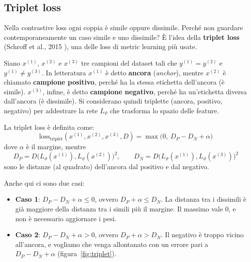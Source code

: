 \subsection{Triplet loss}
Nella contrastive loss ogni coppia è simile oppure dissimile. Perché non guardare contemporaneamente un caso simile e uno dissimile? È l'idea della \textbf{triplet loss} (Schroff et al., 2015 \cite{Schroff2015}), una delle loss di metric learning più usate.

Siano $x^{(1)}$, $x^{(2)}$ e $x^{(3)}$ tre campioni del dataset tali che $y^{(1)} = y^{(2)}$ e $y^{(1)} \neq y^{(3)}$. In letteratura $x^{(1)}$ è detto \textbf{ancora} (\emph{anchor}), mentre $x^{(2)}$ è chiamato \textbf{campione positivo}, perché ha la stessa etichetta dell'ancora (è simile). $x^{(3)}$, infine, è detto \textbf{campione negativo}, perché ha un'etichetta diversa dall'ancora (è dissimile). Si considerano quindi triplette (ancora, positivo, negativo) per addestrare la rete $L_\vartheta$ che trasforma lo spazio delle feature.

\begin{definizione}
La triplet loss è definita come:
\[
\mathrm{loss}_{\mathrm{triplet}}(x^{(1)}, x^{(2)}, x^{(3)}, D) = \max\big(0,\ D_P - D_N + \alpha\big)
\]
dove $\alpha$ è il margine, mentre
\[
D_P = D\big(L_\vartheta(x^{(1)}), L_\vartheta(x^{(2)})\big)^2, \qquad D_N = D\big(L_\vartheta(x^{(1)}), L_\vartheta(x^{(3)})\big)^2
\]
sono le distanze (al quadrato) dell'ancora dal positivo e dal negativo.
\end{definizione}

Anche qui ci sono due casi:
\begin{itemize}
    \item \textbf{Caso 1}: $D_P - D_N + \alpha \le 0$, ovvero $D_P + \alpha \le D_N$. La distanza tra i dissimili è già maggiore della distanza tra i simili più il margine. Il massimo vale 0, e non è necessario aggiornare i pesi.
    \item \textbf{Caso 2}: $D_P - D_N + \alpha > 0$, ovvero $D_P + \alpha > D_N$. Il negativo è troppo vicino all'ancora, e vogliamo che venga allontanato con un errore pari a $D_P - D_N + \alpha$ (figura~\ref{fig:triplet}).
\end{itemize}


